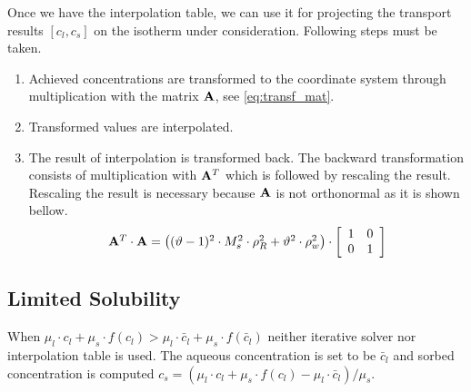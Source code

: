 Once we have the interpolation table, we can use it for projecting the transport results ${[c_l,c_s]}$ on the 
isotherm under consideration. Following steps must be taken.
\begin{enumerate}
 \item Achieved concentrations are transformed to the coordinate system through multiplication with the 
       matrix ${\bf A}$, see \eqref{eq:transf_mat}.
 \item Transformed values are interpolated.
 \item The result of interpolation is transformed back. The backward transformation consists of multiplication 
       with ${\bf A}^T$ which is followed by rescaling the result. Rescaling the result is necessary because  
       ${\bf A}$ is not orthonormal as it is shown bellow.
 \[
 \begin{array}{l}
 {\bf A}^T\cdot{\bf A} =
  \left((\vartheta - 1)^2\cdot M_s^2\cdot \rho_R^2 + \vartheta^2\cdot \rho_w^2\right)\cdot\left[\begin{array}{cc}
    1 & 0\\
    0 & 1
  \end{array}\right]
  \end{array}
 \]
\end{enumerate}


\subsection{Limited Solubility}\label{subsec:lim_solub}
When $\mu_l\cdot c_l + \mu_s\cdot f(c_l) > \mu_l\cdot \bar{c}_l + \mu_s\cdot f(\bar{c}_l)$ neither iterative 
solver nor interpolation table is used. The aqueous concentration is set to be $\bar{c}_l$ and sorbed 
concentration is computed $c_s = (\mu_l\cdot c_l + \mu_s\cdot f(c_l) - \mu_l\cdot \bar{c}_l)/\mu_s$.
